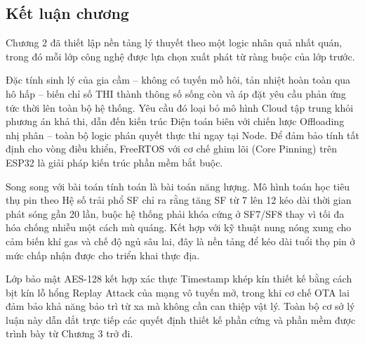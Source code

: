 \subsection{Kết luận chương}

Chương 2 đã thiết lập nền tảng lý thuyết theo một logic nhân quả nhất
quán, trong đó mỗi lớp công nghệ được lựa chọn xuất phát từ ràng buộc
của lớp trước.

Đặc tính sinh lý của gia cầm -- không có tuyến mồ hôi, tản nhiệt hoàn
toàn qua hô hấp -- biến chỉ số THI thành thông số sống còn và áp đặt
yêu cầu phản ứng tức thời lên toàn bộ hệ thống. Yêu cầu đó loại bỏ mô
hình Cloud tập trung khỏi phương án khả thi, dẫn đến kiến trúc Điện
toán biên với chiến lược Offloading nhị phân -- toàn bộ logic phán quyết
thực thi ngay tại Node. Để đảm bảo tính tất định cho vòng điều khiển, FreeRTOS với cơ chế ghim lõi (Core Pinning) trên ESP32 là
giải pháp kiến trúc phần mềm bắt buộc.

Song song với bài toán tính toán là bài toán năng lượng. Mô hình toán
học tiêu thụ pin theo Hệ số trải phổ SF chỉ ra rằng tăng SF từ 7 lên 12
kéo dài thời gian phát sóng gần 20 lần, buộc hệ thống phải khóa cứng ở
SF7/SF8 thay vì tối đa hóa chống nhiễu một cách mù quáng. Kết hợp với
kỹ thuật nung nóng xung cho cảm biến khí gas và chế độ ngủ sâu lai, đây
là nền tảng để kéo dài tuổi thọ pin ở mức chấp nhận được cho triển khai
thực địa.

Lớp bảo mật AES-128 kết hợp xác thực Timestamp khép kín thiết kế bằng
cách bịt kín lỗ hổng Replay Attack của mạng vô tuyến mở, trong
khi cơ chế OTA lai đảm bảo khả năng bảo trì từ xa mà không cần can
thiệp vật lý. Toàn bộ cơ sở lý luận này dẫn dắt trực tiếp các quyết
định thiết kế phần cứng và phần mềm được trình bày từ Chương 3 trở đi.
